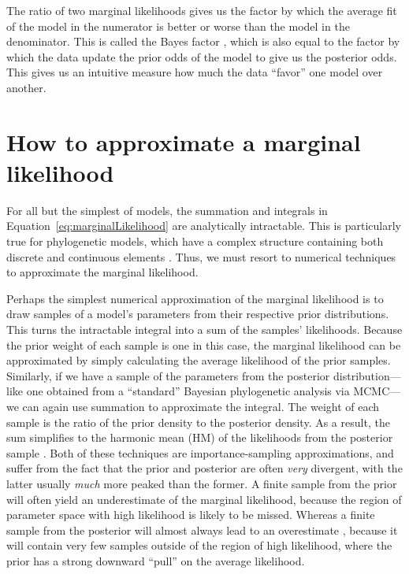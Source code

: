 The ratio of two marginal likelihoods gives us the factor by which the
average fit of the model in the numerator is better or worse than the
model in the denominator.
This is called the Bayes factor \citep{Jeffreys1935}, which is also equal to
the factor by which the data update the prior odds of the model to give us the
posterior odds.
This gives us an intuitive measure how much the data ``favor'' one model over
another.

\section{How to approximate a marginal likelihood}

For all but the simplest of models, the summation and integrals in
Equation~\ref{eq:marginalLikelihood}
are analytically intractable.
This is particularly true for phylogenetic models, which have a complex
structure containing both discrete and continuous elements \citep{Kim2000}.
Thus, we must resort to numerical techniques to approximate the marginal
likelihood.

Perhaps the simplest numerical approximation of the marginal likelihood is to
draw samples of a model's parameters from their respective prior distributions.
This turns the intractable integral into a sum of the samples' likelihoods.
Because the prior weight of each sample is one in this case, the marginal
likelihood can be approximated by simply calculating the average likelihood of
the prior samples.
Similarly, if we have a sample of the parameters from the posterior
distribution---like one obtained from a ``standard'' Bayesian phylogenetic
analysis via MCMC---we can again use summation to approximate the integral.
The weight of each sample is the ratio of the prior density to the posterior
density.
As a result, the sum simplifies to the harmonic mean (HM) of the likelihoods
from the posterior sample \citep{Newton1994}.
Both of these techniques are importance-sampling approximations, and suffer
from the fact that the prior and posterior are often \emph{very} divergent,
with the latter usually \emph{much} more peaked than the former.
A finite sample from the prior will often yield an underestimate of the
marginal likelihood, because the region of parameter space with high likelihood
is likely to be missed.
Whereas a finite sample from the posterior will almost always lead to an
overestimate \citep{Lartillot2006,Xie2011,Fan2011}, because it will contain
very few samples outside of the region of high likelihood, where the prior has
a strong downward ``pull'' on the average likelihood.

